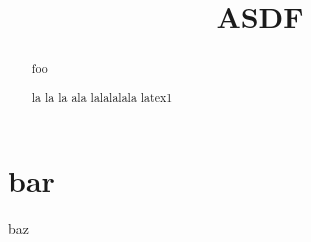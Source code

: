 \documentclass[a4paper,10pt]{scrartcl}
\title{ASDF}
\author{}
\begin{document}
\maketitle

\begin{abstract}
foo

la la la ala lalalalala latex1
\end{abstract}

\section{bar}
baz
\end{document}
